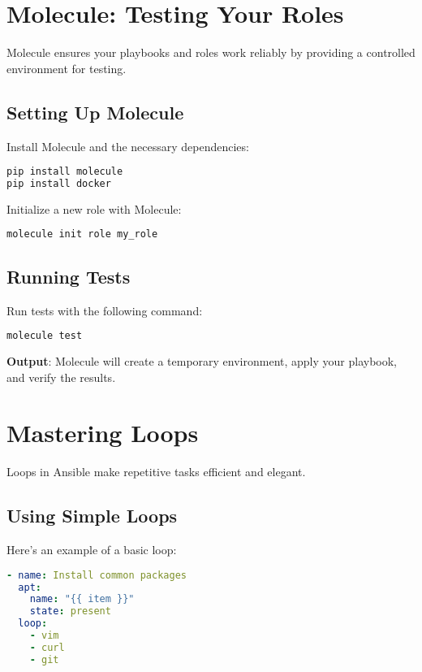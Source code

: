\section{Molecule: Testing Your Roles}

Molecule ensures your playbooks and roles work reliably by providing a controlled environment for testing.

\subsection{Setting Up Molecule}

Install Molecule and the necessary dependencies:
\begin{lstlisting}[language=bash, caption=Installing Molecule]
pip install molecule
pip install docker
\end{lstlisting}

Initialize a new role with Molecule:
\begin{lstlisting}[language=bash, caption=Initializing a Role for Molecule]
molecule init role my_role
\end{lstlisting}

\subsection{Running Tests}

Run tests with the following command:
\begin{lstlisting}[language=bash, caption=Running Molecule Tests]
molecule test
\end{lstlisting}

\textbf{Output}: Molecule will create a temporary environment, apply your playbook, and verify the results.


\section{Mastering Loops}

Loops in Ansible make repetitive tasks efficient and elegant.

\subsection{Using Simple Loops}

Here's an example of a basic loop:
\begin{lstlisting}[language=yaml, caption=Installing Multiple Packages with Loops]
- name: Install common packages
  apt:
    name: "{{ item }}"
    state: present
  loop:
    - vim
    - curl
    - git
\end{lstlisting}

